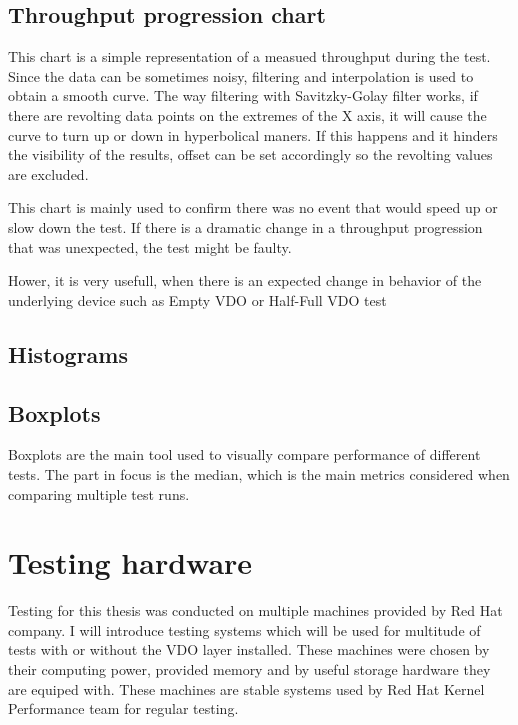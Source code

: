 \documentclass[
  color, %
  table, %
  lof,   %
  lot,   %
]{fithesis3}
\begin{document}
\subsection{Throughput progression chart}
This chart is a simple representation of a measued throughput during the test. Since the data can be sometimes noisy, filtering and interpolation is used to obtain a smooth curve. The way filtering with Savitzky-Golay filter works, if there are revolting data points on the extremes of the X axis, it will cause the curve to turn up or down in hyperbolical maners. If this happens and it hinders the visibility of the results, offset can be set accordingly so the revolting values are excluded.

This chart is mainly used to confirm there was no event that would speed up or slow down the test. If there is a dramatic change in a throughput progression that was unexpected, the test might be faulty.

Hower, it is very usefull, when there is an expected change in behavior of the underlying device such as Empty VDO or Half-Full VDO test

\subsection{Histograms}

\subsection{Boxplots}
Boxplots are the main tool used to visually compare performance of different tests. The part in focus is the median, which is the main metrics considered when comparing multiple test runs.

\section{Testing hardware}
Testing for this thesis was conducted on multiple machines provided by Red Hat company. I will introduce testing systems which will be used for multitude of tests with or without the VDO layer installed. These machines were chosen by their computing power, provided memory and by useful storage hardware they are equiped with. These machines are stable systems used by Red Hat Kernel Performance team for regular testing.
\end{document}
